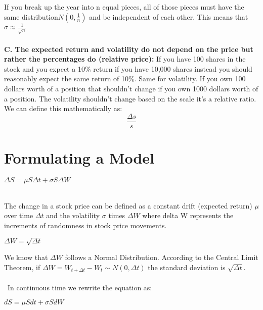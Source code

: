 \documentclass{article}
\begin{document}
        
     \begin{center}
\end{center}
If you break up the year into n equal pieces, all of those pieces must have the same distribution$N(0,\frac{1}{n})$ and be independent of each other. This means that $\sigma\approx\frac{1}{\sqrt{n}}$
\\
\\
\textbf{C. The expected return and volatility do not depend on the price but rather the percentages do (relative price):} If you have 100 shares in the stock and you expect a 10\% return if you have 10,000 shares instead you should reasonably expect the same return of 10\%. Same for volatility. If you own 100 dollars worth of a position that shouldn't change if you own 1000 dollars worth of a position. The volatility shouldn't change based on the scale it's a relative ratio. We can define this mathematically as: 
\\
$$\frac{\Delta s}{s}$$
\newpage
\section{Formulating a Model}
\begin{center}
 $\Delta S = \mu S \Delta t +\sigma S \Delta W$
\\\   

\end{center}

The change in a stock price can be defined as a constant drift (expected return) $\mu$ over time $\Delta t$ and the volatility $\sigma$ times $\Delta W$ where delta W represents the increments of randomness in stock price movements. 
\begin{center}



$\Delta W = \sqrt{\Delta t}$
\end{center}

We know that $\Delta W$ follows a Normal Distribution. According to the Central Limit Theorem, if $\Delta W = W_{t+\Delta t} - W_t \sim N(0, \Delta t)$ the standard deviation is $\sqrt{\Delta t}$. 
\\\
\\\
In continuous time we rewrite the equation as:  
\begin{center}
 $d S = \mu S dt +\sigma S d W$
\\\   

\end{center}
\end{document}
